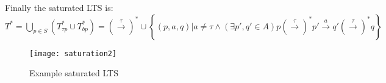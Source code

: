 Finally the saturated LTS is:\\
$T^{*}=\bigcup_{p\in S}\left(T^{*}_{\tau p}\cup T^{*}_{bp}\right)=\left(\stackrel{\tau}{\rightarrow}\right)^{*}\cup\left\{\left(p,a,q\right)|a\neq\tau\wedge\left(\exists p',q'\in A\right) p\left(\stackrel{\tau}{\rightarrow}\right)^{*}p'\stackrel{a}{\rightarrow}q'\left(\stackrel{\tau}{\rightarrow}\right)^{*}q\right\}$

\begin{figure}[!ht]
\centering
\texttt{[image: saturation2]}
\caption{Example saturated LTS}
\label{fig:saturation2}
\end{figure}

    
    

